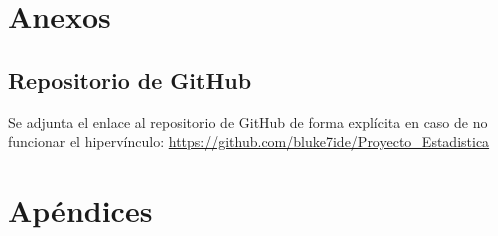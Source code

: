 \documentclass[12pt,oneside,letterpaper,spanish]{report}
\begin{document}


\newpage
\doublespacing
\renewcommand{\baselinestretch}{1}\normalsize
\tableofcontents
\renewcommand{\baselinestretch}{1}\normalsize
\singlespacing
\thispagestyle{fancy} %

\newpage
{} 





%
%
\label{EndOfText}
\newpage
{}
\thispagestyle{fancy}



\nocite{*}

 
\thispagestyle{fancy}

\chapter{Anexos}

\section{Repositorio de GitHub} \label{github}
Se adjunta el enlace al repositorio de GitHub de forma explícita en caso de no funcionar el hipervínculo: \url{https://github.com/bluke7ide/Proyecto_Estadistica}


\chapter{Apéndices} \label{Apendices}


\newpage



\label{endOfDoc}
\end{document}
